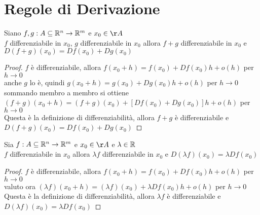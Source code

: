 \section{Regole di Derivazione}
\proposition
Siano $f,g: A\subseteq \mathbb{R}^n \rightarrow \mathbb{R}^m$ e $x_0\in\AA$\\
$f$ differenziabile in $x_0$, $g$ differenziabile in $x_0$ allora $f+g$ differenziabile in $x_0$ e $D(f+g)(x_0) = Df(x_0)+Dg(x_0)$
\begin{proof}
	$f$ è differenziabile, allora $f(x_0+h)=f(x_0)+Df(x_0)h+o(h)$ per $h\rightarrow 0$\\
	anche $g$ lo è, quindi $g(x_0+h)=g(x_0)+Dg(x_0)h+o(h)$ per $h\rightarrow 0$\\
	sommando membro a membro si ottiene  $(f+g)(x_0+h)=(f+g)(x_0)+[Df(x_0)+Dg(x_0)]h+o(h)$ per $h\rightarrow 0$\\
	Questa è la definizione di differenziabilità, allora $f+g$ è differenziabile e $D(f+g)(x_0) = Df(x_0)+Dg(x_0)$
\end{proof}

\proposition
Sia $f: A\subseteq \mathbb{R}^n \rightarrow \mathbb{R}^m$ e $x_0\in\AA$ e $\lambda\in \mathbb{R}$\\
$f$ differenziabile in $x_0$ allora $\lambda f$ differenziabile in $x_0$ e $D(\lambda f)(x_0) = \lambda Df(x_0)$
\begin{proof}
	$f$ è differenziabile, allora $f(x_0+h)=f(x_0)+Df(x_0)h+o(h)$ per $h\rightarrow 0$\\
	valuto ora $(\lambda f)(x_0+h)=(\lambda f)(x_0)+\lambda Df(x_0)h+o(h)$ per $h\rightarrow 0$\\
	Questa è la definizione di differenziabilità, allora $\lambda f$ è differenziabile e $D(\lambda f)(x_0) = \lambda Df(x_0)$
\end{proof}

